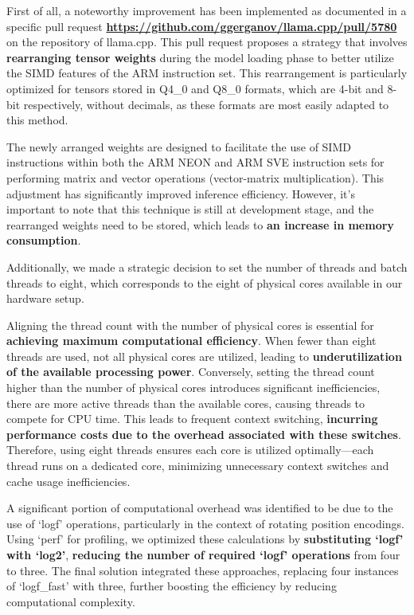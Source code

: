 \documentclass[conference]{IEEEtran}
\begin{document}
First of all, a noteworthy improvement has been implemented as documented in a specific pull request \textbf{\url{https://github.com/ggerganov/llama.cpp/pull/5780}} on the repository of llama.cpp. This pull request proposes a strategy that involves \textbf{rearranging tensor weights} during the model loading phase to better utilize the SIMD features of the ARM instruction set. This rearrangement is particularly optimized for tensors stored in Q4\_0 and Q8\_0 formats, which are 4-bit and 8-bit respectively, without decimals, as these formats are most easily adapted to this method.

The newly arranged weights are designed to facilitate the use of SIMD instructions within both the ARM NEON and ARM SVE instruction sets for performing matrix and vector operations (vector-matrix multiplication). This adjustment has significantly improved inference efficiency. However, it's important to note that this technique is still at development stage, and the rearranged weights need to be stored, which leads to \textbf{an increase in memory consumption}.

Additionally, we made a strategic decision to set the number of threads and batch threads to eight, which corresponds to the eight of physical cores available in our hardware setup.

Aligning the thread count with the number of physical cores is essential for \textbf{achieving maximum computational efficiency}. When fewer than eight threads are used, not all physical cores are utilized, leading to \textbf{underutilization of the available processing power}. Conversely, setting the thread count higher than the number of physical cores introduces significant inefficiencies, there are more active threads than the available cores, causing threads to compete for CPU time. This leads to frequent context switching, \textbf{incurring performance costs due to the overhead associated with these switches}. Therefore, using eight threads ensures each core is utilized optimally—each thread runs on a dedicated core, minimizing unnecessary context switches and cache usage inefficiencies. 

A significant portion of computational overhead was identified to be due to the use of `logf' operations, particularly in the context of rotating position encodings. Using `perf' for profiling, we optimized these calculations by \textbf{substituting `logf' with `log2'}, \textbf{reducing the number of required `logf' operations} from four to three. The final solution integrated these approaches, replacing four instances of `logf\_fast' with three, further boosting the efficiency by reducing computational complexity.
\end{document}

